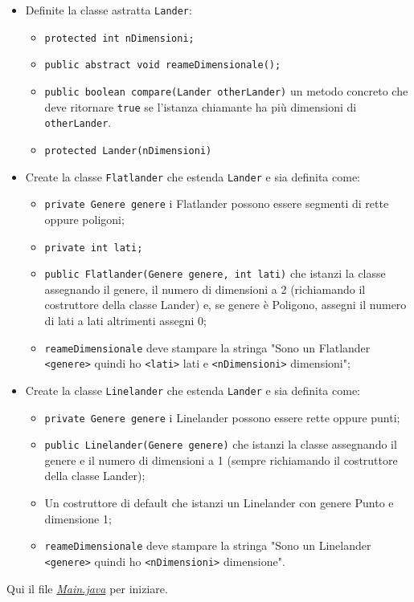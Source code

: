 \documentclass{article}
\begin{document}
\begin{itemize}
    \item Definite la classe astratta \texttt{Lander}:
    \begin{itemize}
        \item \texttt{protected int nDimensioni;}
        \item \texttt{public abstract void reameDimensionale();}
        \item \texttt{public boolean compare(Lander otherLander)} un metodo concreto che deve ritornare \texttt{true} se l'istanza chiamante ha più dimensioni di \texttt{otherLander}.
        \item \texttt{protected Lander(nDimensioni)}
    \end{itemize}
    
    \item Create la classe \texttt{Flatlander} che estenda \texttt{Lander} e sia definita come:
    \begin{itemize}
        \item \texttt{private Genere genere} i Flatlander possono essere segmenti di rette oppure poligoni; \item \texttt{private int lati;}
        \item \texttt{public Flatlander(Genere genere, int lati)} che istanzi la classe assegnando il genere, il numero di dimensioni a 2 (richiamando il costruttore della classe Lander) e, se genere è Poligono, assegni il numero di lati a lati altrimenti assegni 0;
        \item \texttt{reameDimensionale} deve stampare la stringa "Sono un Flatlander \texttt{<genere>} quindi ho \texttt{<lati>} lati e \texttt{<nDimensioni>} dimensioni";
    \end{itemize}
    
    \item Create la classe \texttt{Linelander} che estenda \texttt{Lander} e sia definita come:
    \begin{itemize}
        \item \texttt{private Genere genere} i Linelander possono essere rette oppure punti;
        \item \texttt{public Linelander(Genere genere)} che istanzi la classe assegnando il genere e il numero di dimensioni a 1 (sempre richiamando il costruttore della classe Lander);
        \item Un costruttore di default che istanzi un Linelander con genere Punto e dimensione 1;
        \item \texttt{reameDimensionale} deve stampare la stringa "Sono un Linelander \texttt{<genere>} quindi ho \texttt{<nDimensioni>} dimensione".
    \end{itemize}
\end{itemize}
Qui il file \href{https://raw.githubusercontent.com/alterax05/Tutorati-P2/refs/heads/main/tutorato%203%2025-03/3TutP2/src/es1/MainEs1.java}{\textit{Main.java}} per iniziare.
\end{document}
